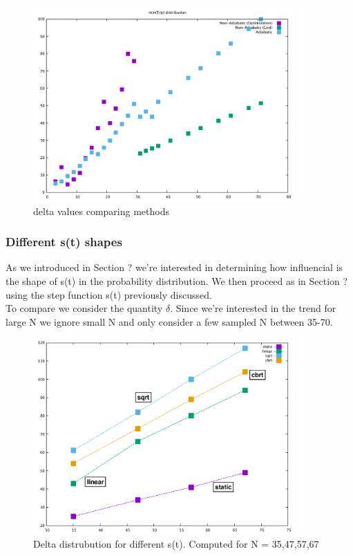 \documentclass[aps,pra,reprint, onecolumn]{revtex4-2}
\begin{document}
\begin{figure}[ht]
\includegraphics[width=10cm]{./figures/delta.pdf}%
\caption{delta values comparing methods}
\end{figure}


\subsubsection{\textbf{Different s(t) shapes}}
As we introduced in Section ? we're interested in determining how influencial is the shape of s(t) in the probability distribution. We then proceed as in Section ? using the step function s(t) previously discussed. \\ To compare we consider the quantity $\delta$. Since we're interested in the trend for large N we ignore small N and only consider a few sampled N between 35-70.

\clearpage
\begin{figure}[ht]
\includegraphics[width=10cm]{./figures/9_Giugno.pdf}
\caption{Delta distrubution for different s(t). Computed for N = 35,47,57,67}
\end{figure}
\end{document}
